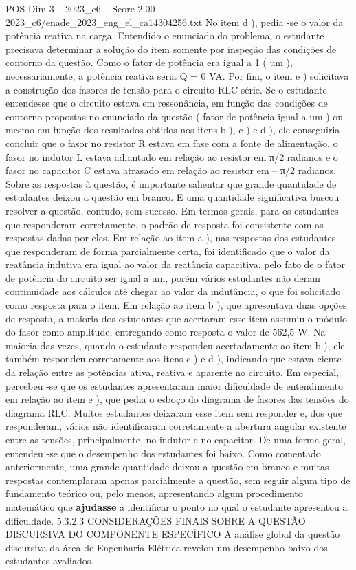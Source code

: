 \begin{textsample}{POS Dim 3 – 2023\_c6 – Score 2.00 – 2023\_c6/enade\_2023\_eng\_el\_ca14304256.txt}
No item d ), pedia -se o valor da potência reativa na carga.
Entendido o enunciado do problema, o estudante precisava determinar a solução do item somente por inspeção das condições de contorno da questão.
Como o fator de potência era igual a 1 ( um ), necessariamente, a potência reativa seria Q = 0 VA.
Por fim, o item e ) solicitava a construção dos fasores de tensão para o circuito RLC série.
Se o estudante entendesse que o circuito estava em ressonância, em função das condições de contorno propostas no enunciado da questão ( fator de potência igual a um ) ou mesmo em função dos resultados obtidos nos itens b ), c ) e d ), ele conseguiria concluir que o fasor no resistor R estava em fase com a fonte de alimentação, o fasor no indutor L estava adiantado em relação ao resistor em π/2 radianos e o fasor no capacitor C estava atrasado em relação ao resistor em – π/2 radianos.
Sobre as respostas à questão, é importante salientar que grande quantidade de estudantes deixou a questão em branco.
E uma quantidade significativa buscou resolver a questão, contudo, sem sucesso.
Em termos gerais, para os estudantes que responderam corretamente, o padrão de resposta foi consistente com as respostas dadas por eles.
Em relação ao item a ), nas respostas dos estudantes que responderam de forma parcialmente certa, foi identificado que o valor da reatância indutiva era igual ao valor da reatância capacitiva, pelo fato de o fator de potência do circuito ser igual a um, porém vários estudantes não deram continuidade aos cálculos até chegar ao valor da indutância, o que foi solicitado como resposta para o item.
Em relação ao item b ), que apresentava duas opções de resposta, a maioria dos estudantes que acertaram esse item assumiu o módulo do fasor como amplitude, entregando como resposta o valor de 562,5 W.
Na maioria das vezes, quando o estudante respondeu acertadamente ao item b ), ele também respondeu corretamente aos itens c ) e d ), indicando que estava ciente da relação entre as potências ativa, reativa e aparente no circuito.
Em especial, percebeu -se que os estudantes apresentaram maior dificuldade de entendimento em relação ao item e ), que pedia o esboço do diagrama de fasores das tensões do diagrama RLC.
Muitos estudantes deixaram esse item sem responder e, dos que responderam, vários não identificaram corretamente a abertura angular existente entre as tensões, principalmente, no indutor e no capacitor.
De uma forma geral, entendeu -se que o desempenho dos estudantes foi baixo.
Como comentado anteriormente, uma grande quantidade deixou a questão em branco e muitas respostas contemplaram apenas parcialmente a questão, sem seguir algum tipo de fundamento teórico ou, pelo menos, apresentando algum procedimento matemático que \textbf{ajudasse} a identificar o ponto no qual o estudante apresentou a dificuldade. 5.3.2.3 CONSIDERAÇÕES FINAIS SOBRE A QUESTÃO DISCURSIVA DO COMPONENTE ESPECÍFICO A análise global da questão discursiva da área de Engenharia Elétrica revelou um desempenho baixo dos estudantes avaliados.

\end{textsample}
